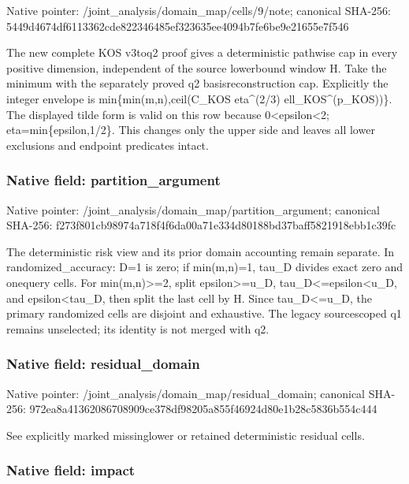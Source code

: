 \documentclass[10pt,a4paper]{article}
\begin{document}
Native pointer: /joint\_analysis/domain\_map/cells/9/note; canonical SHA-256: 5449d4674df6113362cde822\allowbreak{}346485ef323635ee4094b7fe\allowbreak{}6be9e21655e7f546


The new complete KOS v3toq2 proof gives a deterministic pathwise cap in every positive dimension, independent of the source lowerbound window H. Take the minimum with the separately proved q2 basisreconstruction cap. Explicitly the integer envelope is min\{min(m,n),ceil(C\_KOS eta\textasciicircum{}(2/3) ell\_KOS\textasciicircum{}(p\_KOS))\}. The displayed tilde form is valid on this row because 0<epsilon<2; eta=min\{epsilon,1/2\}. This changes only the upper side and leaves all lower exclusions and endpoint predicates intact.


\subsubsection{Native field: partition\_argument}


Native pointer: /joint\_analysis/domain\_m\allowbreak{}ap/partition\_argument; canonical SHA-256: f273f801cb98974a718f4f6d\allowbreak{}a00a71e334d80188bd37baff\allowbreak{}5821918ebb1c39fc


The deterministic risk view and its prior domain accounting remain separate. In randomized\_accuracy: D=1 is zero; if min(m,n)=1, tau\_D divides exact zero and onequery cells. For min(m,n)>=2, split epsilon>=u\_D, tau\_D<=epsilon<u\_D, and epsilon<tau\_D, then split the last cell by H. Since tau\_D<=u\_D, the primary randomized cells are disjoint and exhaustive. The legacy sourcescoped q1 remains unselected; its identity is not merged with q2.


\subsubsection{Native field: residual\_domain}


Native pointer: /joint\_analysis/domain\_m\allowbreak{}ap/residual\_domain; canonical SHA-256: 972ea8a41362086708909ce3\allowbreak{}78df98205a855f46924d80e1\allowbreak{}b28c5836b554c444


See explicitly marked missinglower or retained deterministic residual cells.


\subsubsection{Native field: impact}
\end{document}
